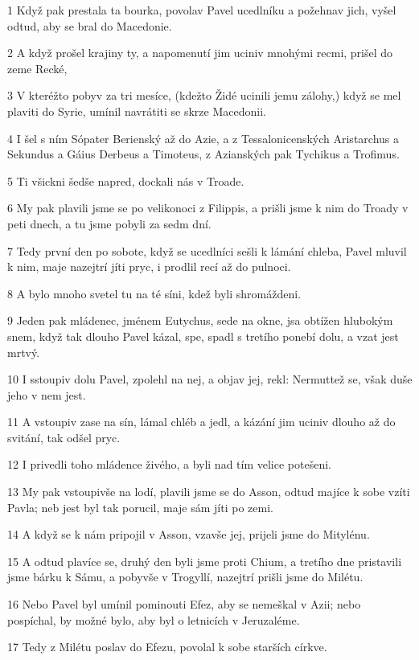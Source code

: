 \par 1 Když pak prestala ta bourka, povolav Pavel ucedlníku a požehnav jich, vyšel odtud, aby se bral do Macedonie.
\par 2 A když prošel krajiny ty, a napomenutí jim uciniv mnohými recmi, prišel do zeme Recké,
\par 3 V kteréžto pobyv za tri mesíce, (kdežto Židé ucinili jemu zálohy,) když se mel plaviti do Syrie, umínil navrátiti se skrze Macedonii.
\par 4 I šel s ním Sópater Berienský až do Azie, a z Tessalonicenských Aristarchus a Sekundus a Gáius Derbeus a Timoteus, z Azianských pak Tychikus a Trofimus.
\par 5 Ti všickni šedše napred, dockali nás v Troade.
\par 6 My pak plavili jsme se po velikonoci z Filippis, a prišli jsme k nim do Troady v peti dnech, a tu jsme pobyli za sedm dní.
\par 7 Tedy první den po sobote, když se ucedlníci sešli k lámání chleba, Pavel mluvil k nim, maje nazejtrí jíti pryc, i prodlil recí až do pulnoci.
\par 8 A bylo mnoho svetel tu na té síni, kdež byli shromáždeni.
\par 9 Jeden pak mládenec, jménem Eutychus, sede na okne, jsa obtížen hlubokým snem, když tak dlouho Pavel kázal, spe, spadl s tretího ponebí dolu, a vzat jest mrtvý.
\par 10 I sstoupiv dolu Pavel, zpolehl na nej, a objav jej, rekl: Nermuttež se, však duše jeho v nem jest.
\par 11 A vstoupiv zase na sín, lámal chléb a jedl, a kázání jim uciniv dlouho až do svitání, tak odšel pryc.
\par 12 I privedli toho mládence živého, a byli nad tím velice potešeni.
\par 13 My pak vstoupivše na lodí, plavili jsme se do Asson, odtud majíce k sobe vzíti Pavla; neb jest byl tak porucil, maje sám jíti po zemi.
\par 14 A když se k nám pripojil v Asson, vzavše jej, prijeli jsme do Mitylénu.
\par 15 A odtud plavíce se, druhý den byli jsme proti Chium, a tretího dne pristavili jsme bárku k Sámu, a pobyvše v Trogyllí, nazejtrí prišli jsme do Milétu.
\par 16 Nebo Pavel byl umínil pominouti Efez, aby se nemeškal v Azii; nebo pospíchal, by možné bylo, aby byl o letnicích v Jeruzaléme.
\par 17 Tedy z Milétu poslav do Efezu, povolal k sobe starších církve.
